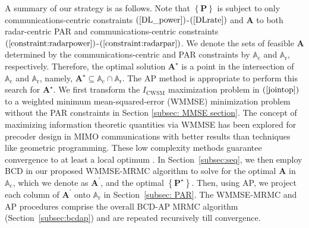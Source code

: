 \documentclass[9pt,journal]{IEEEtran}
\newcommand{\paren}[1]{\left({#1}\right)}
\newcommand{\braces}[1]{{\left\{ {#1}\right\}}}
\theoremstyle{definition}
\begin{document}
A summary of our strategy is as follows. Note that ${\braces{\mathbf{P}}}$ is subject to only communications-centric constraints $\paren{\mathrm{\ref{DL_power}}}$-$\paren{\mathrm{\ref{DLrate}}}$ and $\mathbf{A}$ to both radar-centric PAR and communications-centric constraints $\paren{\mathrm{\ref{constraint:radarpower}}}$-$\paren{\mathrm{\ref{constraint:radarpar}}}$. %
We denote the sets of feasible $\mathbf{A}$ determined by the communications-centric and PAR constraints by $\mathbb{A}_{\textrm{c}}$ and $\mathbb{A}_{\textrm{r}}$, respectively. Therefore, the optimal solution %
$\mathbf{A}^\star$ is a point in the intersection of $\mathbb{A}_{\textrm{c}}$ and $\mathbb{A}_{\textrm{r}}$, namely, $\mathbf{A}^\star\subseteq\mathbb{A}_{\textrm{c}}\cap\mathbb{A}_{\textrm{r}}$. The AP method \cite{arXiv180203889Z,nearestvector} is appropriate to perform this search for $\mathbf{A}^\star$. We first transform the $I_{\textrm{CWSM}}$ maximization problem in $\paren{\ref{jointop}}$ to a weighted minimum mean-squared-error (WMMSE) minimization problem without the PAR constraints in Section \ref{subsec: MMSE section}. The concept of maximizing information theoretic quantities via WMMSE has been explored for precoder design in MIMO communications \cite{Luo2011IterativeWMMSE,FD_WMMSE} with better results than techniques like  geometric programming. These low complexity methods guarantee convergence to at least a local optimum \cite{Luo2011IterativeWMMSE}. In Section~\ref{subsec:seq}, we then employ BCD in our proposed WMMSE-MRMC algorithm to solve for the optimal $\mathbf{A}$ in $\mathbb{A}_{\textrm{c}}$, which we denote as $\mathbf{A}^\prime$, and the optimal %
$\braces{\mathbf{P}^\star}$. %
   Then, using AP, we project each column of $\mathbf{A}^\prime$ onto $\mathbb{A}_{\textrm{r}}$ in Section~\ref{subsec: PAR}. The WMMSE-MRMC and AP procedures comprise the overall BCD-AP MRMC algorithm (Section~\ref{subsec:bcdap}) and are repeated recursively till convergence.
\end{document}
